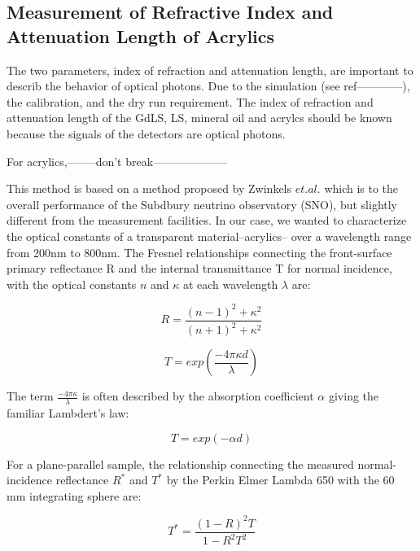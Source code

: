 \subsection {Measurement of Refractive Index and Attenuation Length of Acrylics}
\label {sec:RTMethod}

The two parameters, index of refraction and attenuation length, are important
to describ the behavior of optical photons. Due to the simulation (see ref------------),
the calibration, and the dry run requirement. The index of refraction and attenuation length
of the GdLS, LS, mineral oil and acrylcs should be known because the signals of the detectors
are optical photons.

For acrylics,--------don't break--------------------

This method is based on a method proposed by Zwinkels $et. al.$ \cite{RTMethod} which
is to the overall performance of the Subdbury neutrino observatory (SNO),
but slightly different from the measurement facilities. In our case, we wanted to characterize the optical constants of a
transparent material--acrylics-- over a wavelength range from 200nm to 800nm. The Fresnel relationships connecting the front-surface
primary reflectance R and the internal transmittance T for normal incidence, with the optical constants $n$ and $\kappa$ at each wavelength $\lambda$
are:


\begin{equation}
\label{eq:FSR}
R = \frac{(n-1)^2 + \kappa^2}{(n+1)^2 + \kappa^2}
\end{equation}


\begin{equation}
\label{eq:IT}
T = exp(\frac{-4{\pi}{\kappa}d}{\lambda})
\end{equation}

The term $\frac{-4{\pi}{\kappa}}{\lambda}$ is often described by the absorption coefficient $\alpha$ giving the familiar Lambdert's law:

\begin{equation}
\label{eq:Lambdert}
T = exp(-{\alpha}d)
\end{equation}

For a plane-parallel sample, the relationship connecting the measured normal-incidence reflectance $R^*$ and $T^*$ by the
Perkin Elmer Lambda 650 with the 60 mm integrating sphere are:


\begin{equation}
\label{eq:TStar}
T^* = \frac{(1-R)^2T}{1-R^2T^2}
\end{equation}


